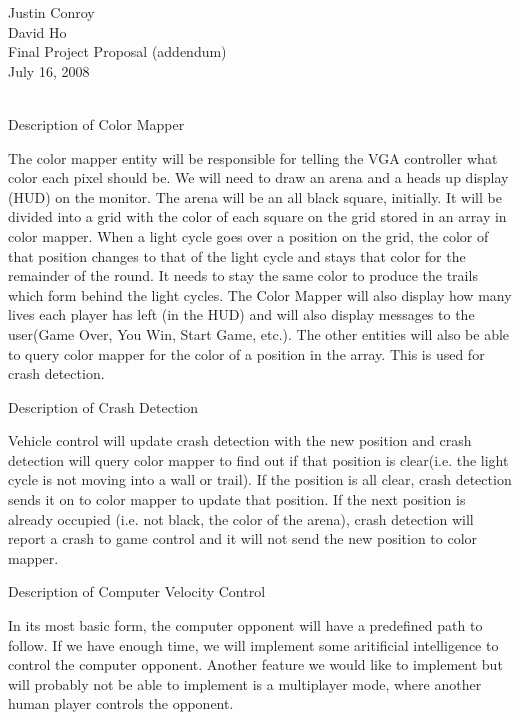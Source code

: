 \documentclass[12pt,letterpaper] {article}
\begin{document}
\noindent Justin Conroy\\
David Ho\\
Final Project Proposal (addendum)\\
July 16, 2008\\
\\

\begin{center} \LARGE{Description of Color Mapper}\\ \end{center}

The color mapper entity will be responsible for telling the VGA controller what color each pixel should be. We will need to draw an arena and a heads up display (HUD) on the monitor. The arena will be an all black square, initially. It will be divided into a grid with the color of each square on the grid stored in an array in color mapper. When a light cycle goes over a position on the grid, the color of that position changes to that of the light cycle and stays that color for the remainder of the round. It needs to stay the same color to produce the trails which form behind the light cycles. The Color Mapper will also display how many lives each player has left (in the HUD) and will also display messages to the user(Game Over, You Win, Start Game, etc.). The other entities will also be able to query color mapper for the color of a position in the array. This is used for crash detection.\\

\begin{center} \LARGE{Description of Crash Detection}\\ \end{center}
Vehicle control will update crash detection with the new position and crash detection will query color mapper to find out if that position is clear(i.e. the light cycle is not moving into a wall or trail). If the position is all clear, crash detection sends it on to color mapper to update that position. If the next position is already occupied (i.e. not black, the color of the arena), crash detection will report a crash to game control and it will not send the new position to color mapper.\\

\begin{center} \LARGE{Description of Computer Velocity Control}\\\end{center}
In its most basic form, the computer opponent will have a predefined path to follow. If we have enough time, we will implement some aritificial intelligence to control the computer opponent. Another feature we would like to implement but will probably not be able to implement is a multiplayer mode, where another human player controls the opponent.\\
\end{document}
